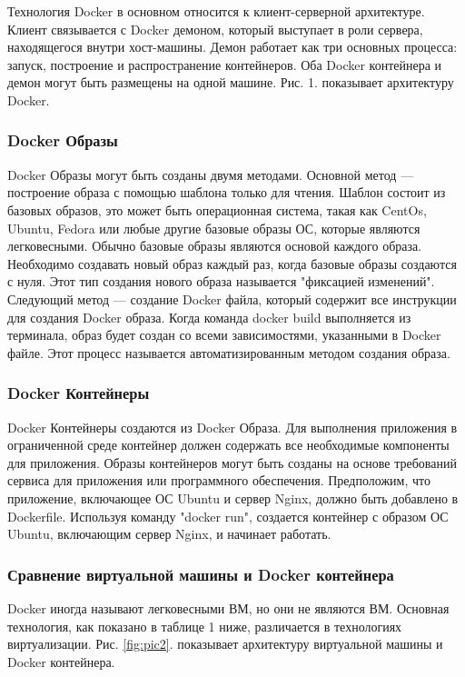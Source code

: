 \documentclass{mirea}
\begin{document}
	Технология Docker в основном относится к клиент-серверной архитектуре. Клиент связывается с Docker демоном, который выступает в роли сервера, находящегося внутри хост-машины. Демон работает как три основных процесса: запуск, построение и распространение контейнеров. Оба Docker контейнера и демон могут быть размещены на одной машине. Рис. 1. показывает архитектуру Docker.
	
	\subsubsection{Docker Образы}
	
	Docker Образы могут быть созданы двумя методами. Основной метод — построение образа с помощью шаблона только для чтения. Шаблон состоит из базовых образов, это может быть операционная система, такая как CentOs, Ubuntu, Fedora или любые другие базовые образы ОС, которые являются легковесными. Обычно базовые образы являются основой каждого образа. Необходимо создавать новый образ каждый раз, когда базовые образы создаются с нуля. Этот тип создания нового образа называется "фиксацией изменений". Следующий метод — создание Docker файла, который содержит все инструкции для создания Docker образа. Когда команда docker build выполняется из терминала, образ будет создан со всеми зависимостями, указанными в Docker файле. Этот процесс называется автоматизированным методом создания образа.
	
	\subsubsection{Docker Контейнеры}
	
	Docker Контейнеры создаются из Docker Образа. Для выполнения приложения в ограниченной среде контейнер должен содержать все необходимые компоненты для приложения. Образы контейнеров могут быть созданы на основе требований сервиса для приложения или программного обеспечения. Предположим, что приложение, включающее ОС Ubuntu и сервер Nginx, должно быть добавлено в Dockerfile. Используя команду "docker run", создается контейнер с образом ОС Ubuntu, включающим сервер Nginx, и начинает работать.
	
	\subsubsection{Сравнение виртуальной машины и Docker контейнера}
	
	Docker иногда называют легковесными ВМ, но они не являются ВМ. Основная технология, как показано в таблице 1 ниже, различается в технологиях виртуализации. Рис. \ref{fig:pic2}. показывает архитектуру виртуальной машины и Docker контейнера.
	
\end{document}
